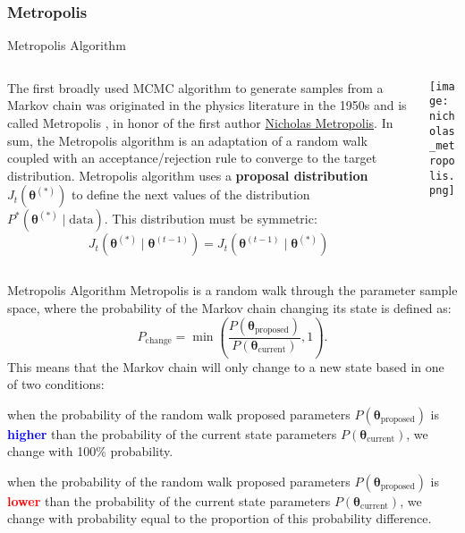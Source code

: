 \subsubsection{Metropolis}
\begin{frame}{Metropolis Algorithm}
	\begin{columns}
		\begin{column}{0.8\textwidth}
			The first broadly used MCMC algorithm to generate samples from a Markov chain
			was originated in the physics literature in the 1950s and is called Metropolis
			\parencite{metropolisEquationStateCalculations1953},
			in honor of the first author
			\href{https://en.wikipedia.org/wiki/Nicholas_Metropolis}{Nicholas Metropolis}.
			\vfill
			In sum, the Metropolis algorithm is an adaptation of a random walk coupled
			with an acceptance/rejection rule to converge to the target distribution.
			\vfill
			Metropolis algorithm uses a \textbf{proposal distribution}
			$J_t(\boldsymbol{\theta}^{(*)})$
			to define the next values of the distribution
			$P^*(\boldsymbol{\theta}^{(*)} \mid \text{data})$.
			This distribution must be symmetric:
			$$
				J_t (\boldsymbol{\theta}^{(*)} \mid \boldsymbol{\theta}^{(t-1)}) = J_t(\boldsymbol{\theta}^{(t-1)} \mid \boldsymbol{\theta}^{(*)})
			$$
		\end{column}
		\begin{column}{0.2\textwidth}
			\centering
			\texttt{[image: nicholas\_metropolis.png]}
		\end{column}
	\end{columns}
\end{frame}

\begin{frame}{Metropolis Algorithm}
	Metropolis is a random walk through the parameter sample space,
	where the probability of the Markov chain changing its state is defined as:
	$$
		P_{\text{change}} = \min\left({\frac{P (\boldsymbol{\theta}_{\text{proposed}})}{P (\boldsymbol{\theta}_{\text{current}})}},1\right).
	$$
	This means that the Markov chain will only change to a new state based in one of two conditions:
	\begin{vfilleditems}
		\small
		\item when the probability of the random walk proposed parameters
		$P(\boldsymbol{\theta}_{\text{proposed}})$ is \textbf{\textcolor{blue}{higher}}
		than the probability of the current state parameters
		$P(\boldsymbol{\theta}_{\text{current}})$,
		we change with 100\% probability.
		\item when the probability of the random walk proposed parameters
		$P(\boldsymbol{\theta}_{\text{proposed}})$ is \textbf{\textcolor{red}{lower}}
		than the probability of the current state parameters
		$P(\boldsymbol{\theta}_{\text{current}})$,
		we change with probability equal to the proportion of this probability difference.
	\end{vfilleditems}
\end{frame}

